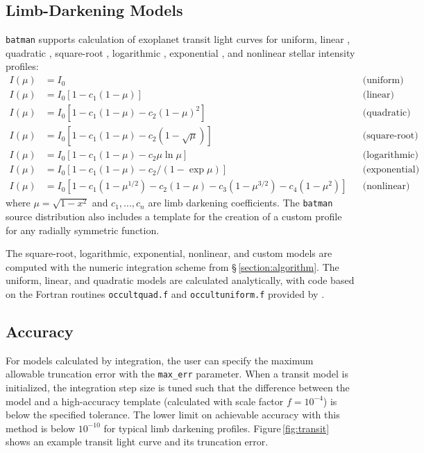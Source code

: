\documentclass[12pt,preprint]{aastex}
\begin{document}
\subsection{Limb-Darkening Models}
\texttt{batman} supports calculation of exoplanet transit light curves for uniform, linear \citep{schwarzschild06}, quadratic \citep{kopal50}, square-root \citep{diaz-cordoves92}, logarithmic \citep{klinglesmith70}, exponential \citep{claret03}, and nonlinear \citep{claret00} stellar intensity profiles:
\begin{align}
  I(\mu) &= I_0                                                                         & &\text{(uniform)}             \\
  I(\mu) &= I_0[1 - c_1(1-\mu)]                                                         & &\text{(linear)}              \\
  I(\mu) &= I_0[1 - c_1(1 - \mu) - c_2(1-\mu)^2]                                        & &\text{(quadratic)}           \\
  I(\mu) &= I_0[1 - c_1(1 - \mu) - c_2(1-\sqrt{\mu})]                                   & &\text{(square-root)}         \\
  I(\mu) &= I_0[1 - c_1(1 - \mu) - c_2\mu\ln{\mu}]                                      & &\text{(logarithmic)}         \\
  I(\mu) &= I_0\left[1 - c_1(1 - \mu) - c_2/(1-\exp{\mu})\right]                  	& &\text{(exponential)}         \\
  I(\mu) &= I_0[1 - c_1(1-\mu^{1/2}) - c_2(1- \mu) - c_3(1-\mu^{3/2}) - c_4(1-\mu^2)]   & &\text{(nonlinear)}
\end{align}
where $\mu = \sqrt{1-x^2}$ and $c_1, ..., c_n$ are limb darkening coefficients.  The \texttt{batman} source distribution also includes a template for the creation of a custom profile for any radially symmetric function.  

The square-root, logarithmic, exponential, nonlinear, and custom models are computed with the numeric integration scheme from \S\,\ref{section:algorithm}.  The uniform, linear, and quadratic models are calculated analytically, with code based on the Fortran routines \texttt{occultquad.f} and \texttt{occultuniform.f} provided by \cite{mandel02}.  

\subsection{Accuracy}
For models calculated by integration, the user can specify the maximum allowable truncation error with the \texttt{max\_err} parameter.  When a transit model is initialized, the integration step size is tuned such that the difference between the model and a high-accuracy template (calculated with scale factor $f = 10^{-4}$) is below the specified tolerance.  The lower limit on achievable accuracy with this method is below $10^{-10}$ for typical limb darkening profiles. Figure\,\ref{fig:transit} shows an example transit light curve and its truncation error.
\end{document}
